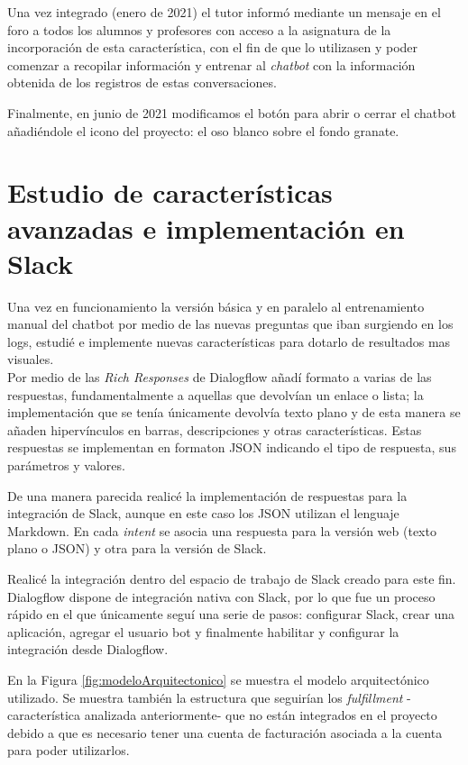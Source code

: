 
Una vez integrado (enero de 2021) el tutor informó mediante un mensaje en el foro a todos los alumnos y profesores con acceso a la asignatura de la incorporación de esta característica, con el fin de que lo utilizasen y poder comenzar a recopilar información y entrenar al \textit{chatbot} con la información obtenida de los registros de estas conversaciones.

Finalmente, en junio de 2021 modificamos el botón para abrir o cerrar el chatbot añadiéndole el icono del proyecto: el oso blanco sobre el fondo granate.



\newpage
\section{Estudio de características avanzadas e implementación en Slack}

Una vez en funcionamiento la versión básica y en paralelo al entrenamiento manual del chatbot por medio de las nuevas preguntas que iban surgiendo en los logs, estudié e implemente nuevas características para dotarlo de resultados mas visuales.\\
Por medio de las \textit{Rich Responses} de Dialogflow añadí formato a varias de las respuestas, fundamentalmente a aquellas que devolvían un enlace o lista; la implementación que se tenía únicamente devolvía texto plano y de esta manera se añaden hipervínculos en barras, descripciones y otras características. Estas respuestas se implementan en formaton JSON indicando el tipo de respuesta, sus parámetros y valores.

De una manera parecida realicé la implementación de respuestas para la integración de Slack, aunque en este caso los JSON utilizan el lenguaje Markdown. En cada \textit{intent} se asocia una respuesta para la versión web (texto plano o JSON) y otra para la versión de Slack.

Realicé la integración dentro del espacio de trabajo de Slack creado para este fin. Dialogflow dispone de integración nativa con Slack, por lo que fue un proceso rápido en el que únicamente seguí una serie de pasos: configurar Slack, crear una aplicación, agregar el usuario bot y finalmente habilitar y configurar la integración desde Dialogflow.


En la Figura \ref{fig:modeloArquitectonico} se muestra el modelo arquitectónico utilizado. Se muestra también la estructura que seguirían los \textit{fulfillment} -característica analizada anteriormente- que no están integrados en el proyecto debido a que es necesario tener una cuenta de facturación asociada a la cuenta para poder utilizarlos.

